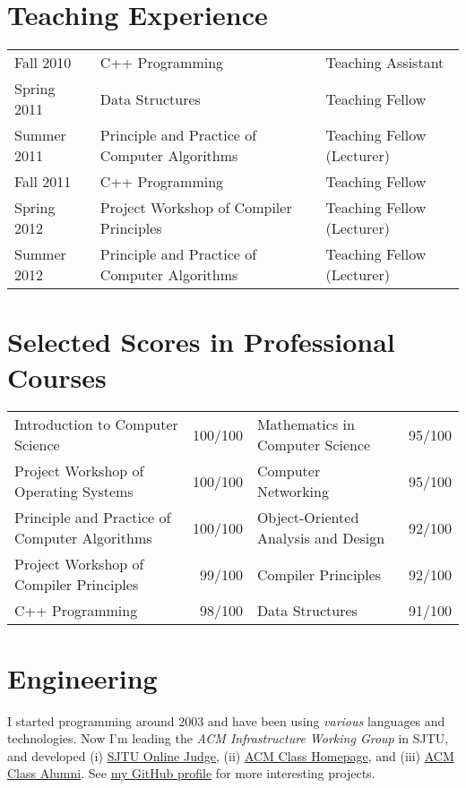 \documentclass[letterpaper]{article}
\begin{document}
\vspace{-7mm}
\section*{Teaching Experience}
\vspace{-2mm}
\begin{tabular}{lll}
  Fall 2010   & C++ Programming & Teaching Assistant \\
  Spring 2011 & Data Structures & Teaching Fellow \\
  Summer 2011 & Principle and Practice of Computer Algorithms & Teaching Fellow (Lecturer) \\
  Fall 2011   & C++ Programming & Teaching Fellow \\
  Spring 2012 & Project Workshop of Compiler Principles & Teaching Fellow (Lecturer) \\
  Summer 2012 & Principle and Practice of Computer Algorithms & Teaching Fellow (Lecturer)
\end{tabular}


\vspace{-2mm}
\section*{Selected Scores in Professional Courses}
\vspace{-1mm}
\begin{tabular}{lr|lr}
  Introduction to Computer Science & 100/100 &
    Mathematics in Computer Science & 95/100 \\
  Project Workshop of Operating Systems & 100/100 &
    Computer Networking & 95/100 \\
  Principle and Practice of Computer Algorithms & 100/100 &
    Object-Oriented Analysis and Design & 92/100 \\
  Project Workshop of Compiler Principles & 99/100 &
    Compiler Principles & 92/100 \\
  C++ Programming & 98/100 &
    Data Structures & 91/100
\end{tabular}


\vspace{-2mm}
\section*{Engineering}
\vspace{-1mm}
I started programming around 2003 and have been using \emph{various} languages and technologies.
Now I'm leading the \emph{ACM Infrastructure Working Group} in SJTU, and developed
(i) \href{http://acm.sjtu.edu.cn/OnlineJudge/}{SJTU Online Judge},
(ii) \href{http://acm.sjtu.edu.cn/}{ACM Class Homepage}, and
(iii) \href{http://acm.sjtu.edu.cn/xiaoyou/}{ACM Class Alumni}.
See \href{https://github.com/stfairy}{my GitHub profile} for more interesting projects.
\end{document}
